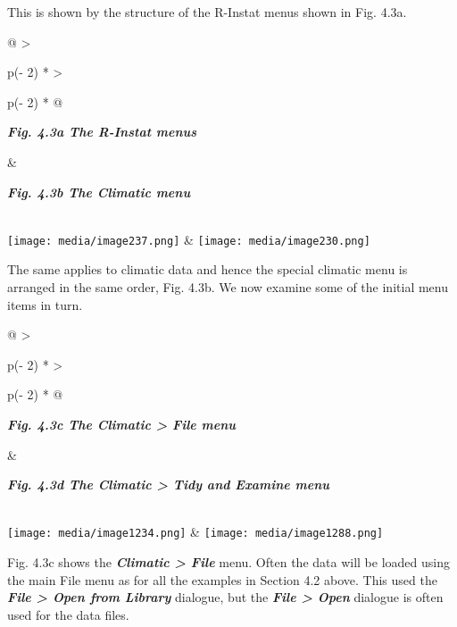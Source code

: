 \documentclass[
  letterpaper,
  DIV=11,
  numbers=noendperiod]{scrreprt}
\begin{document}
This is shown by the structure of the R-Instat menus shown in Fig. 4.3a.

\begin{longtable}[]{@{}
  >{\raggedright\arraybackslash}p{(\columnwidth - 2\tabcolsep) * }
  >{\raggedright\arraybackslash}p{(\columnwidth - 2\tabcolsep) * }@{}}
\toprule\noalign{}
\begin{minipage}[b]{\linewidth}\raggedright
\textbf{\emph{Fig. 4.3a The R-Instat menus}}
\end{minipage} & \begin{minipage}[b]{\linewidth}\raggedright
\textbf{\emph{Fig. 4.3b The Climatic menu}}
\end{minipage} \\
\midrule\noalign{}
\endhead
\bottomrule\noalign{}
\endlastfoot
\texttt{[image: media/image237.png]} &
\texttt{[image: media/image230.png]} \\
\end{longtable}

The same applies to climatic data and hence the special climatic menu is
arranged in the same order, Fig. 4.3b. We now examine some of the
initial menu items in turn.

\begin{longtable}[]{@{}
  >{\raggedright\arraybackslash}p{(\columnwidth - 2\tabcolsep) * }
  >{\raggedright\arraybackslash}p{(\columnwidth - 2\tabcolsep) * }@{}}
\toprule\noalign{}
\begin{minipage}[b]{\linewidth}\raggedright
\textbf{\emph{Fig. 4.3c The Climatic \textgreater{} File menu}}
\end{minipage} & \begin{minipage}[b]{\linewidth}\raggedright
\textbf{\emph{Fig. 4.3d The Climatic \textgreater{} Tidy and Examine
menu}}
\end{minipage} \\
\midrule\noalign{}
\endhead
\bottomrule\noalign{}
\endlastfoot
\texttt{[image: media/image1234.png]}
&
\texttt{[image: media/image1288.png]} \\
\end{longtable}

Fig. 4.3c shows the \textbf{\emph{Climatic \textgreater{} File}} menu.
Often the data will be loaded using the main File menu as for all the
examples in Section 4.2 above. This used the \textbf{\emph{File
\textgreater{} Open from Library}} dialogue, but the \textbf{\emph{File
\textgreater{} Open}} dialogue is often used for the data files.
\end{document}
